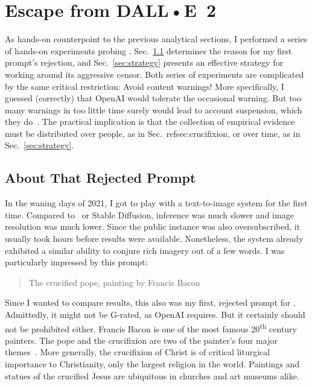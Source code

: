 
\section{Escape from DALL•E~2}
\label{sec:escape}

As hands-on counterpoint to the previous analytical sections, I performed a
series of hands-on experiments probing \DALLE. Sec.\ \ref{sec:crucifixion}
determines the reason for my first prompt's rejection, and Sec.\
\ref{sec:strategy} presents an effective strategy for working around its
aggressive censor. Both series of experiments are complicated by the same
critical restriction: Avoid content warnings! More specifically, I guessed
(correctly) that OpenAI would tolerate the occasional warning. But too many
warnings in too little time surely would lead to account suspension, which they
do~\cite{SpicyElephant2022}. The practical implication is that the collection of
empirical evidence must be distributed over people, as in Sec.\
ref{sec:crucifixion}, or over time, as in Sec.\ \ref{sec:strategy}.


\subsection{About That Rejected Prompt}
\label{sec:crucifixion}

In the waning days of 2021, I got to play with a text-to-image system for the
first time. Compared to \DALLE\ or Stable Diffusion, inference was much slower
and image resolution was much lower. Since the public instance was also
oversubscribed, it usually took hours before results were available.
Nonetheless, the system already exhibited a similar ability to conjure rich
imagery out of a few words. I was particularly impressed by this prompt:

\begin{quote}
\openfat{}The crucified pope, painting by Francis Bacon\closefat{}
\end{quote}

\noindent{}Since I wanted to compare results, this also was my first, rejected
prompt for \DALLE. Admittedly, it might not be G-rated, as OpenAI requires. But
it certainly should not be prohibited either. Francis Bacon is one of the most
famous 20\textsuperscript{th} century painters. The pope and the crucifixion are
two of the painter's four major themes~\cite{Wikipedia2023}. More generally, the
crucifixion of Christ is of critical liturgical importance to Christianity, only
the largest religion in the world. Paintings and statues of the crucified Jesus
are ubiquitous in churches and art museums alike.

